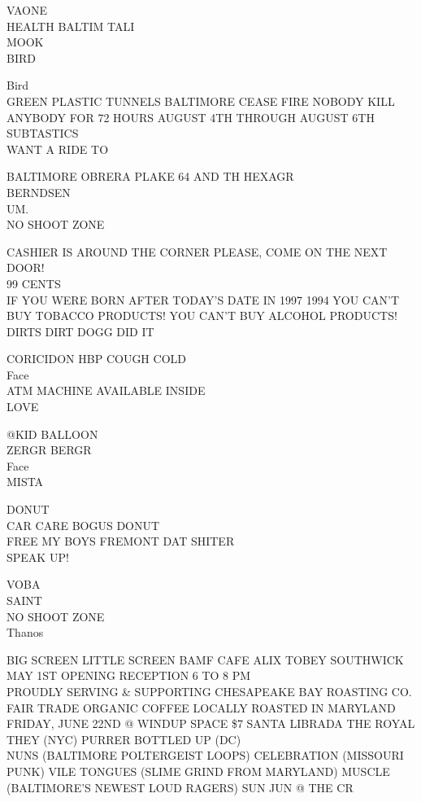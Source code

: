 \documentclass[10pt,letterpaper]{article}
\begin{document}
VAONE\\
HEALTH BALTIM TALI\\
MOOK\\
BIRD

Bird\\
GREEN PLASTIC TUNNELS BALTIMORE CEASE FIRE NOBODY KILL ANYBODY FOR 72 HOURS AUGUST 4TH THROUGH AUGUST 6TH\\
SUBTASTICS\\
WANT A RIDE TO

BALTIMORE OBRERA PLAKE 64 AND TH HEXAGR\\
BERNDSEN\\
UM.\\
NO SHOOT ZONE

CASHIER IS AROUND THE CORNER PLEASE, COME ON THE NEXT DOOR!\\
99 CENTS\\
IF YOU WERE BORN AFTER TODAY'S DATE IN 1997 1994 YOU CAN'T BUY TOBACCO PRODUCTS!  YOU CAN'T BUY ALCOHOL PRODUCTS!\\
DIRTS DIRT DOGG DID IT

CORICIDON HBP COUGH COLD\\
Face\\
ATM MACHINE AVAILABLE INSIDE\\
LOVE

@KID BALLOON\\
ZERGR BERGR\\
Face\\
MISTA

DONUT\\
CAR CARE BOGUS DONUT\\
FREE MY BOYS FREMONT DAT SHITER\\
SPEAK UP!

VOBA\\
SAINT\\
NO SHOOT ZONE\\
Thanos

BIG SCREEN LITTLE SCREEN BAMF CAFE ALIX TOBEY SOUTHWICK MAY 1ST OPENING RECEPTION 6 TO 8 PM\\
PROUDLY SERVING \& SUPPORTING CHESAPEAKE BAY ROASTING CO. FAIR TRADE ORGANIC COFFEE LOCALLY ROASTED IN MARYLAND\\
FRIDAY, JUNE 22ND @ WINDUP SPACE \$7 SANTA LIBRADA THE ROYAL THEY (NYC) PURRER BOTTLED UP (DC)\\
NUNS (BALTIMORE POLTERGEIST LOOPS) CELEBRATION (MISSOURI PUNK) VILE TONGUES (SLIME GRIND FROM MARYLAND) MUSCLE (BALTIMORE'S NEWEST LOUD RAGERS) SUN JUN @ THE CR
\end{document}

